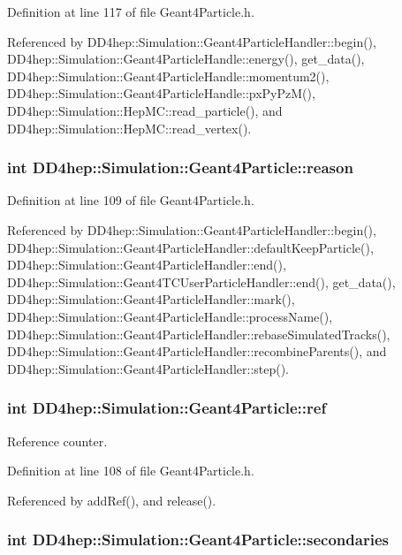 Definition at line 117 of file Geant4Particle.h.

Referenced by DD4hep::Simulation::Geant4ParticleHandler::begin(), DD4hep::Simulation::Geant4ParticleHandle::energy(), get\_\-data(), DD4hep::Simulation::Geant4ParticleHandle::momentum2(), DD4hep::Simulation::Geant4ParticleHandle::pxPyPzM(), DD4hep::Simulation::HepMC::read\_\-particle(), and DD4hep::Simulation::HepMC::read\_\-vertex().\hypertarget{class_d_d4hep_1_1_simulation_1_1_geant4_particle_a290a8ba466d76df567c0a9809a80fbc1}{
\subsubsection[{reason}]{\setlength{\rightskip}{0pt plus 5cm}int {\bf DD4hep::Simulation::Geant4Particle::reason}}}
\label{class_d_d4hep_1_1_simulation_1_1_geant4_particle_a290a8ba466d76df567c0a9809a80fbc1}


Definition at line 109 of file Geant4Particle.h.

Referenced by DD4hep::Simulation::Geant4ParticleHandler::begin(), DD4hep::Simulation::Geant4ParticleHandler::defaultKeepParticle(), DD4hep::Simulation::Geant4ParticleHandler::end(), DD4hep::Simulation::Geant4TCUserParticleHandler::end(), get\_\-data(), DD4hep::Simulation::Geant4ParticleHandler::mark(), DD4hep::Simulation::Geant4ParticleHandle::processName(), DD4hep::Simulation::Geant4ParticleHandler::rebaseSimulatedTracks(), DD4hep::Simulation::Geant4ParticleHandler::recombineParents(), and DD4hep::Simulation::Geant4ParticleHandler::step().\hypertarget{class_d_d4hep_1_1_simulation_1_1_geant4_particle_a45f03922ef0363d2598befeec4027d59}{
\subsubsection[{ref}]{\setlength{\rightskip}{0pt plus 5cm}int {\bf DD4hep::Simulation::Geant4Particle::ref}}}
\label{class_d_d4hep_1_1_simulation_1_1_geant4_particle_a45f03922ef0363d2598befeec4027d59}


Reference counter. 

Definition at line 108 of file Geant4Particle.h.

Referenced by addRef(), and release().\hypertarget{class_d_d4hep_1_1_simulation_1_1_geant4_particle_ac27f420d9419ca31a1506cc6ac419043}{
\subsubsection[{secondaries}]{\setlength{\rightskip}{0pt plus 5cm}int {\bf DD4hep::Simulation::Geant4Particle::secondaries}}}
\label{class_d_d4hep_1_1_simulation_1_1_geant4_particle_ac27f420d9419ca31a1506cc6ac419043}


